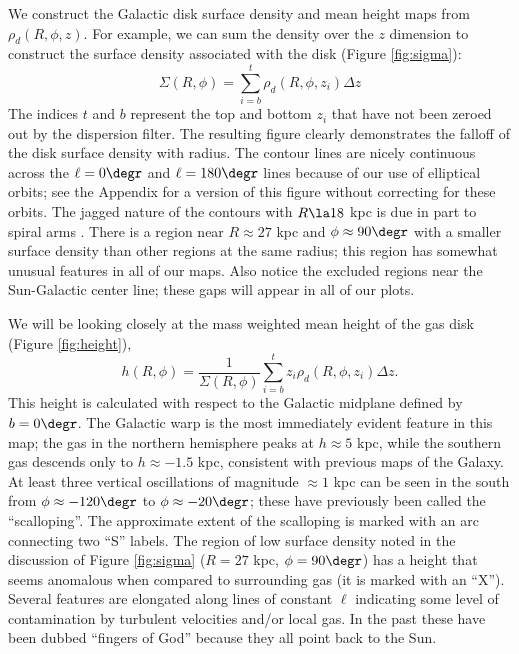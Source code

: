 \documentclass[apj]{emulateapj}
\begin{document}
   We construct the Galactic disk surface density and mean height maps from $\rho_d(R,\phi,z)$. For example, we can sum the density over the $z$ dimension to construct the surface density associated with the disk  (Figure \ref{fig:sigma}):
   \begin{equation}
    \Sigma(R,\phi)=  \sum_{i=b}^t \rho_d(R,\phi,z_i) \Delta z
   \end{equation}
   The indices $t$ and $b$ represent  the top and bottom $z_i$ that have not been zeroed out by the dispersion filter. 
  The resulting figure clearly demonstrates the falloff of the disk surface density with radius. The contour lines are nicely continuous across the $\ell=0\degr$ and $\ell=180\degr$ lines because of our use of elliptical orbits; see the Appendix for a version of this figure without correcting for these orbits.  The jagged nature of the contours with $R\la 18$ kpc is  due in part to spiral arms \citep{LBH2006}. There is a region near $R\approx 27$ kpc and $\phi\approx90\degr$ with a smaller surface density than other regions at the same radius; this region has somewhat unusual features in all of our maps. 
   Also notice the excluded regions near the Sun-Galactic center line; these gaps will appear in all of our plots.
   
    We will be looking closely at the mass weighted mean height of the gas disk  (Figure \ref{fig:height}),
   \begin{equation}
 h(R,\phi)=\frac{1}{\Sigma(R,\phi)}\sum_{i=b}^{t} z_i \rho_d(R,\phi,z_i) \Delta z.
 \end{equation}
This height is calculated with respect to the Galactic midplane defined by $b=0\degr$. The Galactic warp is the most immediately evident feature in this map; the gas in the northern hemisphere peaks at $h\approx5$ kpc, while the southern gas descends only to $h\approx-1.5$ kpc,  consistent with previous maps of the Galaxy.  At least three vertical oscillations of magnitude $\approx 1$ kpc can be seen in the south from $\phi\approx-120\degr$ to $\phi\approx-20\degr$; these have previously been called the ``scalloping''. The approximate extent of the scalloping is marked with an arc connecting two ``S'' labels. The region of low surface density  noted in the discussion of Figure \ref{fig:sigma} ($R=27$ kpc, $\phi=90\degr$) has a height that seems anomalous when compared to surrounding gas (it is marked with an ``X''). Several features are elongated along lines of constant $\ell$ indicating some level of contamination by turbulent velocities and/or local gas. In the past these have been dubbed ``fingers of God'' because they all point back to the Sun.
    
\end{document}
